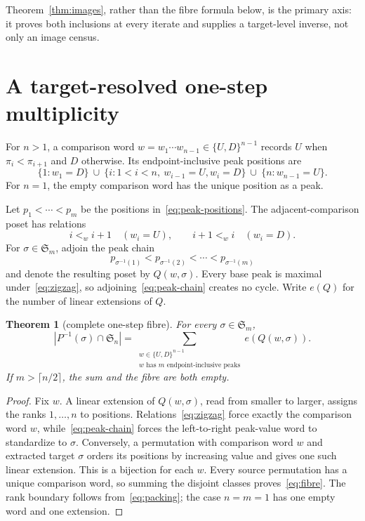 \documentclass[a4paper,10pt]{amsart}
\newtheorem{theorem}{Theorem}
\theoremstyle{definition}
\theoremstyle{remark}
\newcommand{\Sn}{\mathfrak S}
\begin{document}
Theorem~\ref{thm:images}, rather than the fibre formula below, is the primary
axis: it proves both inclusions at every iterate and supplies a target-level
inverse, not only an image census.

\section{A target-resolved one-step multiplicity}

For $n>1$, a comparison word $w=w_1\cdots w_{n-1}\in\{U,D\}^{n-1}$ records
$U$ when $\pi_i<\pi_{i+1}$ and $D$ otherwise.  Its endpoint-inclusive peak
positions are
\begin{equation}\label{eq:peak-positions}
 \{1:w_1=D\}\ \cup\
 \{i:1<i<n,\ w_{i-1}=U,w_i=D\}\ \cup\
 \{n:w_{n-1}=U\}.
\end{equation}
For $n=1$, the empty comparison word has the unique position as a peak.

Let $p_1<\cdots<p_m$ be the positions in~\eqref{eq:peak-positions}.  The
adjacent-comparison poset has relations
\begin{equation}\label{eq:zigzag}
 i<_w i+1\quad(w_i=U),
 \qquad
 i+1<_w i\quad(w_i=D).
\end{equation}
For $\sigma\in\Sn_m$, adjoin the peak chain
\begin{equation}\label{eq:peak-chain}
 p_{\sigma^{-1}(1)}<p_{\sigma^{-1}(2)}<\cdots
 <p_{\sigma^{-1}(m)}
\end{equation}
and denote the resulting poset by $Q(w,\sigma)$.  Every base peak is maximal
under~\eqref{eq:zigzag}, so adjoining~\eqref{eq:peak-chain} creates no cycle.
Write $e(Q)$ for the number of linear extensions of $Q$.

\begin{theorem}[complete one-step fibre]\label{thm:fibre}
For every $\sigma\in\Sn_m$,
\begin{equation}\label{eq:fibre}
 |P^{-1}(\sigma)\cap\Sn_n|
 =\sum_{\substack{w\in\{U,D\}^{n-1}\\
                   w\text{ has }m\text{ endpoint-inclusive peaks}}}
       e(Q(w,\sigma)).
\end{equation}
If $m>\lceil n/2\rceil$, the sum and the fibre are both empty.
\end{theorem}

\begin{proof}
Fix $w$.  A linear extension of $Q(w,\sigma)$, read from smaller to larger,
assigns the ranks $1,\ldots,n$ to positions.  Relations~\eqref{eq:zigzag}
force exactly the comparison word $w$, while~\eqref{eq:peak-chain} forces the
left-to-right peak-value word to standardize to $\sigma$.  Conversely, a
permutation with comparison word $w$ and extracted target $\sigma$ orders
its positions by increasing value and gives one such linear extension.
This is a bijection for each $w$.  Every source permutation has a unique
comparison word, so summing the disjoint classes proves~\eqref{eq:fibre}.
The rank boundary follows from~\eqref{eq:packing}; the case $n=m=1$ has one
empty word and one extension.
\end{proof}
\end{document}

